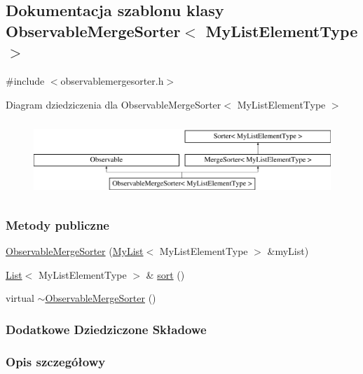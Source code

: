 \hypertarget{class_observable_merge_sorter}{\subsection{Dokumentacja szablonu klasy Observable\-Merge\-Sorter$<$ My\-List\-Element\-Type $>$}
\label{class_observable_merge_sorter}
}


{\ttfamily \#include $<$observablemergesorter.\-h$>$}

Diagram dziedziczenia dla Observable\-Merge\-Sorter$<$ My\-List\-Element\-Type $>$\begin{figure}[H]
\begin{center}
\leavevmode
\includegraphics[height=2.886598cm]{class_observable_merge_sorter}
\end{center}
\end{figure}
\subsubsection*{Metody publiczne}
\begin{DoxyCompactItemize}
\item 
\hyperlink{class_observable_merge_sorter_af447c85bc1fcafd2d1e191968155023a}{Observable\-Merge\-Sorter} (\hyperlink{class_my_list}{My\-List}$<$ My\-List\-Element\-Type $>$ \&my\-List)
\item 
\hyperlink{class_list}{List}$<$ My\-List\-Element\-Type $>$ \& \hyperlink{class_observable_merge_sorter_ac845eed6758733f3935ffb5aa0b5f64a}{sort} ()
\item 
virtual \hyperlink{class_observable_merge_sorter_a7d3a5f7257974ace9094cff9d499df99}{$\sim$\-Observable\-Merge\-Sorter} ()
\end{DoxyCompactItemize}
\subsubsection*{Dodatkowe Dziedziczone Składowe}


\subsubsection{Opis szczegółowy}
